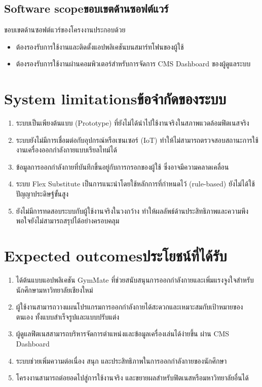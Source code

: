 \subsection{\ifenglish Software scope\else ขอบเขตด้านซอฟต์แวร์\fi}
\enskip ขอบเขตด้านซอฟต์แวร์ของโครงงานประกอบด้วย
\begin{itemize}
    \item ต้องรองรับการใช้งานและติดตั้งแอปพลิเคชันบนสมาร์ทโฟนของผู้ใช้
    \item ต้องรองรับการใช้งานผ่านคอมพิวเตอร์สำหรับการจัดการ CMS Dashboard ของผู้ดูแลระบบ
\end{itemize}

\section{\ifenglish System limitations\else ข้อจำกัดของระบบ\fi}
\begin{enumerate}
\renewcommand{\labelenumi}{1.4.\arabic{enumi}}
    \item ระบบเป็นเพียงต้นแบบ (Prototype) ที่ยังไม่ได้นำไปใช้งานจริงในสภาพแวดล้อมฟิตเนสจริง
    \item ระบบยังไม่มีการเชื่อมต่อกับอุปกรณ์หรือเซนเซอร์ (IoT) ทำให้ไม่สามารถตรวจสอบสถานะการใช้งานเครื่องออกกำลังกายแบบเรียลไทม์ได้
    \item ข้อมูลการออกกำลังกายที่บันทึกขึ้นอยู่กับการกรอกของผู้ใช้ ซึ่งอาจมีความคลาดเคลื่อน
    \item ระบบ Flex Substitute เป็นการแนะนำโดยใช้หลักการที่กำหนดไว้ (rule-based) ยังไม่ได้ใช้ปัญญาประดิษฐ์ขั้นสูง
    \item ยังไม่มีการทดสอบระบบกับผู้ใช้งานจริงในวงกว้าง ทำให้ผลลัพธ์ด้านประสิทธิภาพและความพึงพอใจยังไม่สามารถสรุปได้อย่างครอบคลุม
\end{enumerate}

\section{\ifenglish Expected outcomes\else ประโยชน์ที่ได้รับ\fi}
\setlength{\leftmargini}{1.25cm}
\begin{enumerate}
\renewcommand{\labelenumi}{1.5.\arabic{enumi}}
    \item ได้ต้นแบบแอปพลิเคชัน GymMate ที่ช่วยสนับสนุนการออกกำลังกายและเพิ่มแรงจูงใจสำหรับนักศึกษามหาวิทยาลัยเชียงใหม่
    \item ผู้ใช้งานสามารถวางแผนโปรแกรมการออกกำลังกายได้สะดวกและเหมาะสมกับเป้าหมายของตนเอง ทั้งแบบสำเร็จรูปและแบบปรับแต่ง
    \item ผู้ดูแลฟิตเนสสามารถบริหารจัดการตำแหน่งและข้อมูลเครื่องเล่นได้ง่ายขึ้น ผ่าน CMS Dashboard
    \item ระบบช่วยเพิ่มความต่อเนื่อง สนุก และประสิทธิภาพในการออกกำลังกายของนักศึกษา
    \item โครงงานสามารถต่อยอดไปสู่การใช้งานจริง และขยายผลสำหรับฟิตเนสหรือมหาวิทยาลัยอื่นได้
\end{enumerate}

